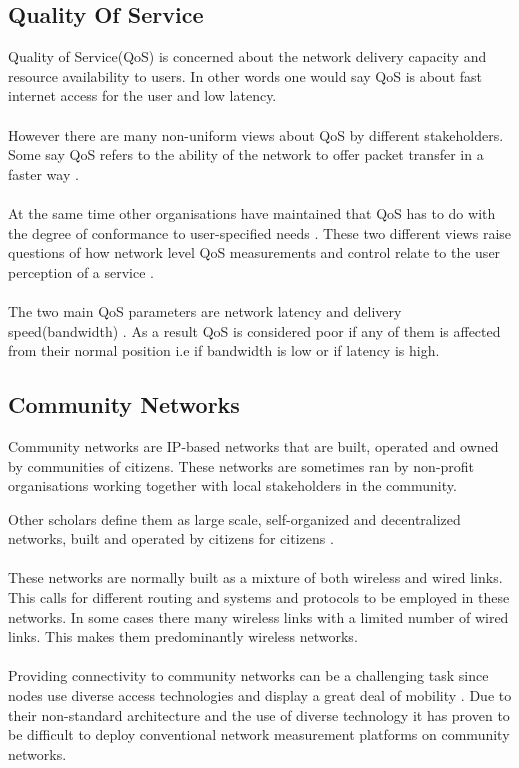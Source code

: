 \subsection{Quality Of Service}
Quality of Service(QoS) is concerned about the network
delivery capacity and resource availability to users\cite{5430142}. In
other words one would say QoS is about fast internet
access for the user and low latency. 
\paragraph{}
However there are many non-uniform views about QoS by different
stakeholders. Some say QoS refers to the ability of the
network to offer packet transfer in a faster way \cite{5430142}.
\paragraph{}
At the same time other organisations have maintained that
QoS has to do with the degree of conformance to user-specified needs \cite{article}. These two different views raise questions of how network level QoS measurements and control relate to the user perception of a service \cite{5430142}.
\paragraph{}
The two main QoS parameters are network latency
and delivery speed(bandwidth) \cite{5430142}. As a result QoS is
considered poor if any of them is affected from their normal position i.e if bandwidth is low or if latency is high.
\subsection{Community Networks}
Community networks are IP-based networks that are built, operated and owned by communities of citizens. These networks are sometimes ran by non-profit organisations working together with local stakeholders in the community. 

Other scholars define them as large scale, self-organized and decentralized networks, built and operated by citizens for citizens \cite{Braem:2013:CRC:2500098.2500108}.
\paragraph{}
These networks are normally built as a mixture of both wireless and wired links. This calls for different routing and systems and protocols to be employed in these networks. In some cases there many wireless links with a limited number of wired links. This makes them predominantly wireless networks\cite{Braem:2013:CRC:2500098.2500108}.
\paragraph{}
Providing connectivity to community networks can be a challenging task since nodes use diverse access technologies and display a great deal of mobility \cite{Plagemann2008}.
Due to their non-standard architecture and the use of diverse technology it has proven to be difficult to deploy conventional network measurement platforms on community networks.

